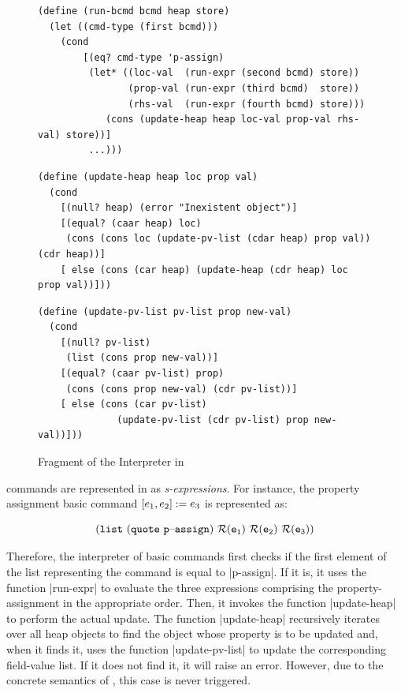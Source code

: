\begin{figure}[t!]
\centering
\begin{lstlisting}
(define (run-bcmd bcmd heap store)
  (let ((cmd-type (first bcmd)))
    (cond
    	[(eq? cmd-type 'p-assign)
      	 (let* ((loc-val  (run-expr (second bcmd) store))
                (prop-val (run-expr (third bcmd)  store))
                (rhs-val  (run-expr (fourth bcmd) store)))
            (cons (update-heap heap loc-val prop-val rhs-val) store))]
         ...)))
\end{lstlisting}

\begin{lstlisting}
(define (update-heap heap loc prop val)
  (cond
    [(null? heap) (error "Inexistent object")]
    [(equal? (caar heap) loc)
     (cons (cons loc (update-pv-list (cdar heap) prop val)) (cdr heap))]
    [ else (cons (car heap) (update-heap (cdr heap) loc prop val))]))
\end{lstlisting}

\begin{lstlisting}         
(define (update-pv-list pv-list prop new-val)
  (cond
    [(null? pv-list)
     (list (cons prop new-val))]
    [(equal? (caar pv-list) prop)
     (cons (cons prop new-val) (cdr pv-list))]
    [ else (cons (car pv-list) 
              (update-pv-list (cdr pv-list) prop new-val))]))
\end{lstlisting}
\vspace*{-0.3cm}
\caption{Fragment of the \jsil Interpreter in \rosette}\label{rosette:interpreter:fragment}
\vspace*{-0.5cm}
\end{figure}


\jsil commands are represented in \rosette as \emph{s-expressions}. 
 For instance, the property assignment basic command $[e_1, e_2] := e_3$
 is represented as: 

\vspace*{-0.2cm}
{\small $$
\mathtt{(list \ (quote\ {p\text{--}assign}) \ \roscomp{\jsilexpr_1} \ \roscomp{\jsilexpr_2} \ \roscomp{\jsilexpr_3})}
$$}
\vspace*{-0.4cm}

\noindent Therefore, the interpreter of basic commands first checks if the first element of the 
list representing the command is equal to \schemeinline|p-assign|. If it is, 
it uses the function \schemeinline|run-expr| to evaluate the three \jsil expressions 
comprising the property-assignment in the appropriate order. Then, it invokes the 
function \schemeinline|update-heap| to perform the actual update. 
The function \schemeinline|update-heap| recursively iterates over all heap objects
to find the object whose property is to be updated and, when it finds it, 
uses the function \schemeinline|update-pv-list| to update the corresponding 
field-value list. If it does not find it, it will raise an error. However, due to the concrete semantics of \jsil, this case is never triggered.


